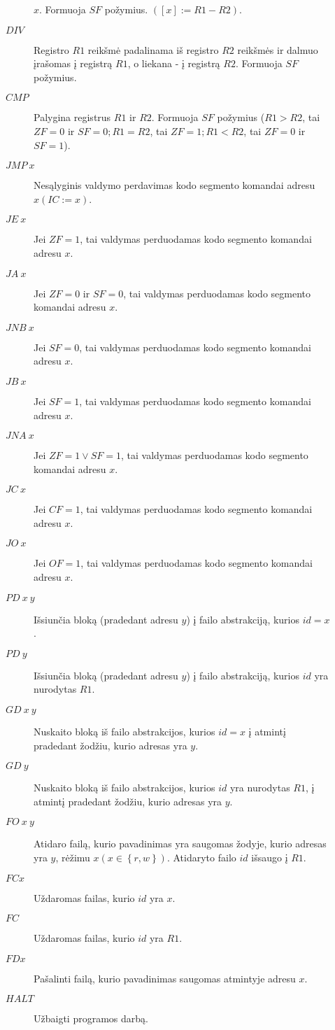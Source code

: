 \begin{description}
\begin{description}
          $x$. Formuoja $SF$ požymius. 
          $([x]:=R1-R2)$.
        \item[$DIV$] Registro $R1$ reikšmė padalinama iš registro $R2$ 
          reikšmės ir dalmuo įrašomas į registrą $R1$, o liekana - į 
          registrą $R2$. Formuoja $SF$ požymius.
        \item[$CMP$] Palygina registrus $R1$ ir $R2$. Formuoja $SF$ požymius
          ($R1>R2$, tai $ZF=0$ ir $SF=0; R1=R2$, tai $ZF=1; R1<R2$, 
          tai $ZF=0$ ir $SF=1$).
        \item[$JMP \: x$] Nesąlyginis valdymo perdavimas kodo segmento 
          komandai adresu  $x (IC:=x)$.
        \item[$JE \: x$] Jei $ZF=1$, tai valdymas perduodamas kodo segmento 
          komandai adresu $x$.
        \item[$JA \: x$] Jei $ZF=0$ ir $SF=0$, tai valdymas perduodamas kodo
          segmento komandai adresu $x$.
        \item[$JNB \: x$] Jei $SF=0$, tai valdymas perduodamas 
          kodo segmento komandai adresu $x$.
        \item[$JB \: x$] Jei $SF=1$, tai valdymas perduodamas kodo segmento
          komandai adresu $x$.
        \item[$JNA \: x$] Jei $ZF = 1 \lor SF=1$, tai valdymas perduodamas 
          kodo segmento komandai adresu $x$.
        \item[$JC \: x$] Jei $CF = 1$, tai valdymas perduodamas kodo 
          segmento komandai adresu $x$.
        \item[$JO \: x$] Jei $OF = 1$, tai valdymas perduodamas kodo 
          segmento komandai adresu $x$.
        \item[$PD \: x \: y$] Išsiunčia bloką (pradedant adresu 
          $y$) į failo abstrakciją, kurios $id = x$.
        \item[$PD \: y$] Išsiunčia bloką (pradedant adresu 
          $y$) į failo abstrakciją, kurios $id$ yra nurodytas $R1$.
        \item[$GD \: x \: y$] Nuskaito bloką iš failo abstrakcijos, kurios
          $id = x$ į atmintį pradedant žodžiu, kurio adresas yra $y$.
        \item[$GD \: y$] Nuskaito bloką iš failo abstrakcijos, kurios
          $id$ yra nurodytas $R1$, į atmintį pradedant žodžiu, kurio 
          adresas yra $y$.
        \item[$FO \: x \: y$] Atidaro failą, kurio pavadinimas yra saugomas
          žodyje, kurio adresas yra $y$, rėžimu 
          $x (x \in \left\{ r, w \right\})$. Atidaryto failo $id$ 
          išsaugo į $R1$.
        \item[$FC x$] Uždaromas failas, kurio $id$ yra $x$.
        \item[$FC$] Uždaromas failas, kurio $id$ yra $R1$.
        \item[$FD x$] Pašalinti failą, kurio pavadinimas saugomas atmintyje
          adresu $x$.
        \item[$HALT$] Užbaigti programos darbą.
    \end{description}
  \end{description} 
  
